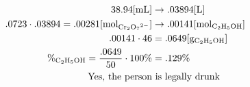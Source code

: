\documentclass[12pt]{article}
\begin{document}
\begin{enumerate}
    \begin{equation}
      \begin{split}
        38.94[\si{\milli\liter}]&\rightarrow.03894[\si{\liter}]\\
        .0723\cdot.03894=.00281[\si{\mole}_{\ce{Cr2O7^{2-}}}]&\rightarrow.00141[\si{\mole}_{\ce{C2H5OH}}]\\
        .00141\cdot46&=.0649[\si{\gram}_{\ce{C2H5OH}}]\\
        \%_{\ce{C2H5OH}}=\frac{.0649}{50}\cdot100\%&=.129\%\\
        \text{Yes, the person} & \text{ is legally drunk}\\
      \end{split}
      \label{4}
    \end{equation}

\end{enumerate}
\end{document}
